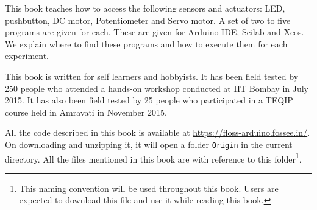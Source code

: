 This book teaches how to access the following sensors and actuators:
LED, pushbutton, DC motor, Potentiometer and Servo motor.  A set of
two to five programs are given for each.  These are given for Arduino
IDE, Scilab and Xcos.  We explain where to find these programs and how
to execute them for each experiment.

This book is written for self learners and hobbyists.  It has been
field tested by 250 people who attended a hands-on workshop conducted
at IIT Bombay in July 2015.  It has also been field tested by 25
people who participated in a TEQIP course held in Amravati in November
2015.  

All the code described in this book is available at
\url{https://floss-arduino.fossee.in/}.  On
downloading and unzipping it, it will open a folder {\tt Origin} in
the current directory.  All the files mentioned in this book are
with reference to this folder\footnote{\label{fn:file-loc}This naming
  convention will be used throughout this book.  Users are expected to
  download this file and use it while reading this book.}.
